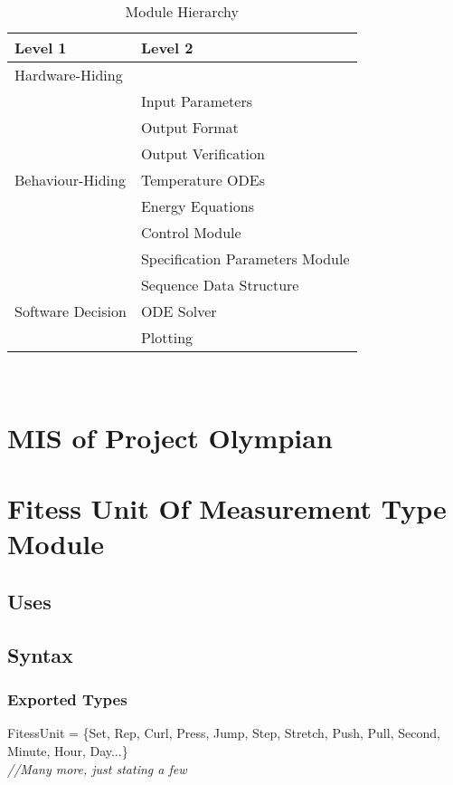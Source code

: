\documentclass[12pt, titlepage]{article}
\begin{document}
\begin{table}[h!]
\centering
\begin{tabular}{p{} p{}}
\toprule
\textbf{Level 1} & \textbf{Level 2}\\
\midrule

{Hardware-Hiding} & ~ \\
\midrule

\multirow{7}{0.3\textwidth}{Behaviour-Hiding} & Input Parameters\\
& Output Format\\
& Output Verification\\
& Temperature ODEs\\
& Energy Equations\\ 
& Control Module\\
& Specification Parameters Module\\
\midrule

\multirow{3}{0.3\textwidth}{Software Decision} & {Sequence Data Structure}\\
& ODE Solver\\
& Plotting\\
\bottomrule

\end{tabular}
\caption{Module Hierarchy}
\label{TblMH}
\end{table}

\newpage
~\newpage

\section{MIS of Project Olympian} \label{Template} 

\section{Fitess Unit Of Measurement Type Module}

\subsection{Uses}

\subsection{Syntax}

\subsubsection{Exported Types}
FitessUnit = \{Set, Rep, Curl, Press, Jump, Step, Stretch, Push, Pull, Second, Minute, Hour, Day...\} 
\\
\textit{//Many more, just stating a few}
\end{document}
